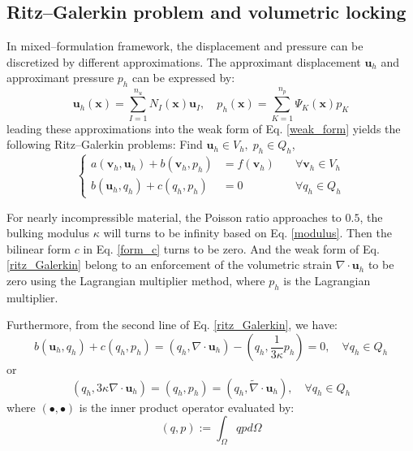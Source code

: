 \subsection{Ritz--Galerkin problem and volumetric locking}
In mixed--formulation framework, the displacement and pressure can be discretized by different approximations. 
The approximant displacement $\boldsymbol u_h$ and approximant pressure $p_h$ can be expressed by:
\begin{equation}
    \boldsymbol u_h(\boldsymbol x) = \sum_{I = 1}^{n_u} N_I(\boldsymbol x) \boldsymbol u_I
    , \quad
    p_h(\boldsymbol x) = \sum_{K = 1}^{n_p} \Psi_K(\boldsymbol x) p_K
\end{equation}
leading these approximations into the weak form of Eq. \eqref{weak_form} yields the following Ritz--Galerkin problems: 
Find $\boldsymbol u_h \in V_h,\;p_h \in Q_h$,
\begin{equation}\label{ritz_Galerkin}
\left \{
\begin{aligned}
    a(\boldsymbol v_h, \boldsymbol u_h) + b(\boldsymbol v_h, p_h) &= f(\boldsymbol v_h) \quad &\forall \boldsymbol v_h \in V_h \\
    b(\boldsymbol u_h, q_h) + c(q_h,p_h) &= 0 \quad &\forall q_h \in Q_h
\end{aligned}
\right .
\end{equation}

For nearly incompressible material, the Poisson ratio approaches to $0.5$, the bulking modulus $\kappa$ will turns to be infinity based on Eq. \eqref{modulus}. 
Then the bilinear form $c$ in Eq. \eqref{form_c} turns to be zero.
And the weak form of Eq. \eqref{ritz_Galerkin} belong to an enforcement of the volumetric strain $\nabla \cdot \boldsymbol u_h$ to be zero using the Lagrangian multiplier method,
where $p_h$ is the Lagrangian multiplier.

Furthermore, from the second line of Eq. \eqref{ritz_Galerkin}, we have:
\begin{equation}
    b(\boldsymbol u_h, q_h) + c(q_h, p_h) = 
    (q_h, \nabla \cdot \boldsymbol u_h) - (q_h, \frac{1}{3\kappa} p_h) = 0
    ,\quad \forall q_h \in Q_h
\end{equation}
or
\begin{equation}\label{orthogonal}
    (q_h, 3\kappa \nabla \cdot \boldsymbol u_h) = (q_h,  p_h) = (q_h, \tilde \nabla \cdot \boldsymbol u_h)
    ,\quad \forall q_h \in Q_h
\end{equation}
where $(\bullet, \bullet)$ is the inner product operator evaluated by:
\begin{equation}
    (q,p) := \int_\Omega qp d\Omega
\end{equation}

